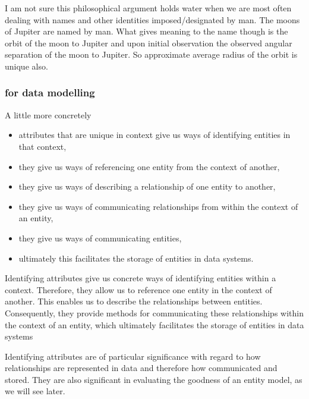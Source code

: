 \mynote 
I am not sure this philosophical argument holds water when we are most often dealing with names and other identities imposed/designated by man. The moons of Jupiter are named by man. What gives meaning to the name though is the orbit of the moon to Jupiter and upon initial observation the observed angular separation of the moon to Jupiter. So approximate average radius of the orbit is unique also. 

\subsubsection{for data modelling}
\mynote A little more concretely 
\begin{itemize}
\item attributes that are unique in context give us ways of identifying entities in that context, 
\item they give us ways of referencing one entity from the context of another, 
\item they give us ways of describing a relationship of one entity to another,
\item they give us ways of communicating relationships from within the context of an entity,
\item they give us ways of communicating entities, 
\item ultimately this facilitates the storage of entities in data systems. 
\end{itemize}

\mynote
Identifying attributes give us concrete ways of identifying entities within a context. Therefore, they allow us to reference one entity in the context of another. This enables us to describe the relationships between entities. Consequently, they provide methods for communicating these relationships within the context of an entity, which ultimately facilitates the storage of entities in data systems

\mynote Identifying attributes are of particular significance with regard to 
 how relationships are represented in data and therefore how communicated and stored.
They are also significant in evaluating the goodness of an entity model, as we will see later.
